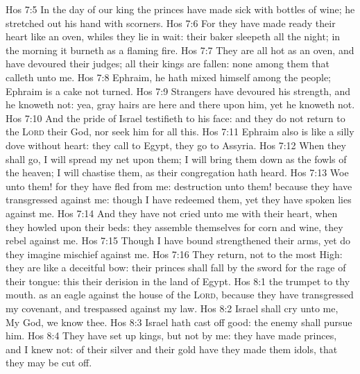 \vs Hos 7:5 In the day of our king the princes have made  sick with bottles of wine; he stretched out his hand with scorners.
\vs Hos 7:6 For they have made ready their heart like an oven, whiles they lie in wait: their baker sleepeth all the night; in the morning it burneth as a flaming fire.
\vs Hos 7:7 They are all hot as an oven, and have devoured their judges; all their kings are fallen:  none among them that calleth unto me.
\vs Hos 7:8 Ephraim, he hath mixed himself among the people; Ephraim is a cake not turned.
\vs Hos 7:9 Strangers have devoured his strength, and he knoweth  not: yea, gray hairs are here and there upon him, yet he knoweth not.
\vs Hos 7:10 And the pride of Israel testifieth to his face: and they do not return to the \textsc{Lord} their God, nor seek him for all this.
\vs Hos 7:11 Ephraim also is like a silly dove without heart: they call to Egypt, they go to Assyria.
\vs Hos 7:12 When they shall go, I will spread my net upon them; I will bring them down as the fowls of the heaven; I will chastise them, as their congregation hath heard.
\vs Hos 7:13 Woe unto them! for they have fled from me: destruction unto them! because they have transgressed against me: though I have redeemed them, yet they have spoken lies against me.
\vs Hos 7:14 And they have not cried unto me with their heart, when they howled upon their beds: they assemble themselves for corn and wine,  they rebel against me.
\vs Hos 7:15 Though I have bound  strengthened their arms, yet do they imagine mischief against me.
\vs Hos 7:16 They return,  not to the most High: they are like a deceitful bow: their princes shall fall by the sword for the rage of their tongue: this  their derision in the land of Egypt.
\vs Hos 8:1  the trumpet to thy mouth.  as an eagle against the house of the \textsc{Lord}, because they have transgressed my covenant, and trespassed against my law.
\vs Hos 8:2 Israel shall cry unto me, My God, we know thee.
\vs Hos 8:3 Israel hath cast off  good: the enemy shall pursue him.
\vs Hos 8:4 They have set up kings, but not by me: they have made princes, and I knew  not: of their silver and their gold have they made them idols, that they may be cut off.

